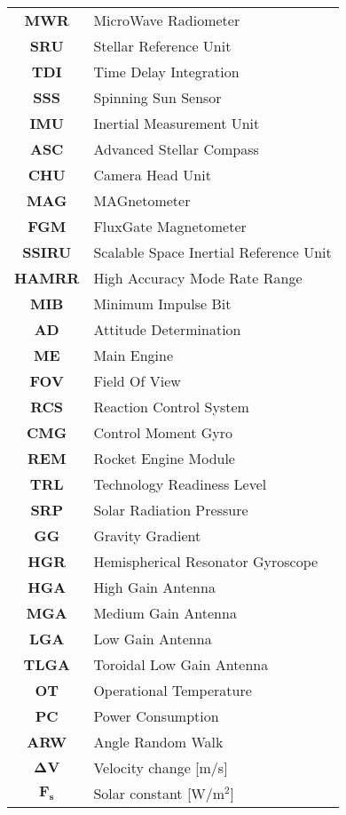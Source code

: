 \begin{multicols}{2}
{\begin{xltabular}{\linewidth}{c>{\raggedright\arraybackslash}X}
		\textbf{MWR} & MicroWave Radiometer \\
		\textbf{SRU} & Stellar Reference Unit \\
		\textbf{TDI} & Time Delay Integration \\
		\textbf{SSS} & Spinning Sun Sensor \\
		\textbf{IMU} & Inertial Measurement Unit \\
		\textbf{ASC} & Advanced Stellar Compass \\
		\textbf{CHU} & Camera Head Unit \\
		\textbf{MAG} & MAGnetometer \\
		\textbf{FGM} & FluxGate Magnetometer \\
		\textbf{SSIRU} & Scalable Space Inertial Reference Unit \\
		\textbf{HAMRR} & High Accuracy Mode Rate Range \\
		\textbf{MIB} & Minimum Impulse Bit \\
		\textbf{AD} & Attitude Determination \\
		\textbf{ME} & Main Engine \\
		\textbf{FOV} & Field Of View \\
		\textbf{RCS} & Reaction Control System \\
		\textbf{CMG} & Control Moment Gyro \\
		\textbf{REM} & Rocket Engine Module \\
		\textbf{TRL} & Technology Readiness Level \\
		\textbf{SRP} & Solar Radiation Pressure \\
		\textbf{GG} & Gravity Gradient \\
		\textbf{HGR} & Hemispherical Resonator Gyroscope \\
		\textbf{HGA} & High Gain Antenna \\
		\textbf{MGA} & Medium Gain Antenna \\
		\textbf{LGA} & Low Gain Antenna \\
		\textbf{TLGA} & Toroidal Low Gain Antenna \\
		\textbf{OT} & Operational Temperature \\
		\textbf{PC} & Power Consumption \\
		\textbf{ARW} & Angle Random Walk \\
		$\boldsymbol{\Delta V}$ & Velocity change [m/s]  \\
		$\boldsymbol{F_s}$ & Solar constant [W/$\textrm{m}^2$] 
 	\end{xltabular}
	\unskip
	\unpenalty
	\unpenalty}
	\unvbox\ltmcbox
\end{multicols}